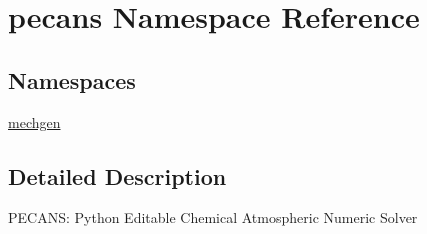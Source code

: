 \hypertarget{namespacepecans}{}\section{pecans Namespace Reference}
\label{namespacepecans}
\subsection*{Namespaces}
\begin{DoxyCompactItemize}
\item 
 \hyperlink{namespacepecans_1_1mechgen}{mechgen}
\end{DoxyCompactItemize}


\subsection{Detailed Description}
\begin{DoxyVerb}PECANS: Python Editable Chemical Atmospheric Numeric Solver
\end{DoxyVerb}
 